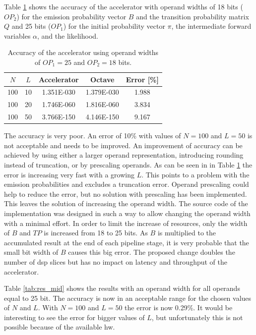 \documentclass[mscthesis]{usiinfthesis}
\begin{document}
Table \ref{tab:res_small} shows the accuracy of the accelerator with operand
widths of 18 bits ($OP_2$) for the emission probability vector $B$ and the
transition probability matrix $Q$ and 25 bits ($OP_1$) for the initial
probability vector $\pi$, the intermediate forward variables $\alpha$, and
the likelihood.

\begin{table}
    \footnotesize
    \begin{center}
    \begin{tabular}{|c|c|c|c|c|}
        \hline
        $N$ & $L$ & Accelerator & Octave & Error [\%] \\
        \hline
        \hline
        100 & 10 & 1.351E-030 & 1.379E-030 & 1.988 \\
        100 & 20 & 1.746E-060 & 1.816E-060 & 3.834 \\
        100 & 50 & 3.766E-150 & 4.146E-150 & 9.167 \\
        \hline
    \end{tabular}
    \end{center}
    \caption{Accuracy of the accelerator using operand widths of $OP_1 = 25$
        and $OP_2 = 18$ bits.}
    \label{tab:res_small}
\end{table}

The accuracy is very poor. An error of 10\% with values of $N=100$ and $L=50$
is not acceptable and needs to be improved. An improvement of accuracy can be
achieved by using either a larger operand representation, introducing rounding
instead of truncation, or by prescaling operands. As can be seen in in Table
\ref{tab:res_small} the error is increasing very fast with a growing $L$. This
points to a problem with the emission probabilities and excludes a truncation
error. Operand prescaling could help to reduce the error, but no solution with
prescaling has been implemented. This leaves the solution of increasing the
operand width. The source code of the implementation was designed in such a way
to allow changing the operand width with a minimal effort. In order to limit
the increase of resources, only the width of $B$ and $TP$ is increased
from 18 to 25 bits. As $B$ is multiplied to the accumulated result at the end
of each pipeline stage, it is very probable that the small bit width of $B$
causes this big error. The proposed change doubles the number of \gls{dsp}
slices but has no impact on latency and throughput of the accelerator.

Table \ref{tab:res_mid} shows the results with an operand width for all operands
equal to 25 bit. The accuracy is now in an acceptable range for the chosen
values of $N$ and $L$. With $N=100$ and $L=50$ the error is now 0.29\%.
It would be interesting to see the error for bigger values of $L$, but
unfortunately this is not possible because of the available \gls{hw}.
\end{document}
